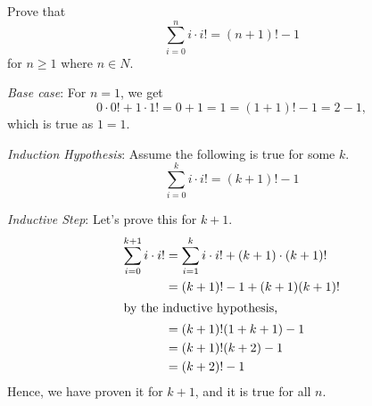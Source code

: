 \question Prove that $$\sum_{i=0}^{n} i \cdot i! = (n+1)! - 1$$  for 
$n \geq 1$ where $n \in N$.
\begin{solution}[3in]

\textit{Base case}: For $n = 1$, we get 
\[0 \cdot  0! + 1 \cdot 1! = 0 + 1 = 1 = (1 + 1)! - 1 = 2 - 1,\] which is true 
as $1 = 1$.

\textit{Induction Hypothesis}: Assume the following is true for some $k$. 
\[\sum_{i=0}^{k} i \cdot i! = (k+1)! - 1\] 

\textit{Inductive Step}: Let's prove this for  $k + 1$.
\begin{align*}
\sum_{i = 0}^{k + 1} i \cdot  i! &= \sum_{i = 1}^k i \cdot  i! + (k + 1) \cdot (k + 1)! \\
&= (k + 1)! - 1 + (k+1)(k+1)!\\
\intertext{by the inductive hypothesis,}
&= (k + 1)!(1 + k + 1) - 1 \\
&= (k + 1)!(k + 2) - 1 \\
&= (k + 2)! - 1
\end{align*}
Hence, we have proven it for $k+1$, and it is true for all $n$.
\end{solution}

\clearpage
